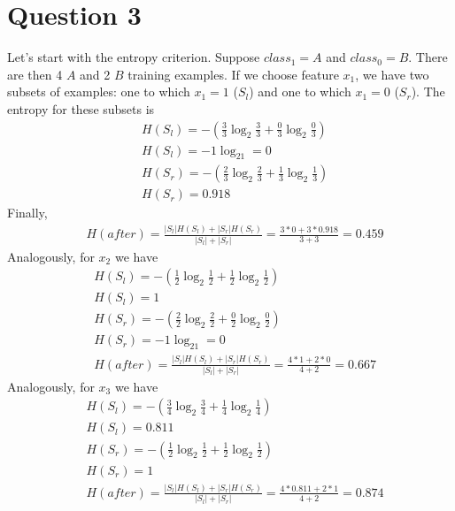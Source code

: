 \documentclass[leqno]{article}
\begin{document}
\hfill


\section*{Question 3} Let's start with the entropy criterion. Suppose $class_1 = A$ and $class_0 = B$. 
There are then 4 $A$ and 2 $B$ training examples. If we choose feature $x_1$, we have two 
subsets of examples: one to which $x_1 = 1$ ($S_l$) and one to which $x_1 = 0$ ($S_r$). The entropy for these 
subsets is 
\begin{equation*}
\begin{split}
&H(S_l) = -(\frac{3}{3}\log_2\frac{3}{3} + \frac{0}{3}\log_2\frac{0}{3}) \\
&H(S_l) = -1\log_21 = 0\\
&H(S_r) = -(\frac{2}{3}\log_2\frac{2}{3} + \frac{1}{3}\log_2\frac{1}{3}) \\
&H(S_r) = 0.918
\end{split}
\end{equation*}
Finally,
\begin{equation*}
\begin{split}
&H(after) = \frac{|S_l|H(S_l) + |S_r|H(S_r)}{|S_l| + |S_r|} = \frac{3*0 + 3*0.918}{3 + 3} = 0.459
\end{split}
\end{equation*} 
Analogously, for $x_2$ we have
\begin{equation*}
\begin{split}
&H(S_l) = -(\frac{1}{2}\log_2\frac{1}{2} + \frac{1}{2}\log_2\frac{1}{2}) \\
&H(S_l) = 1\\
&H(S_r) = -(\frac{2}{2}\log_2\frac{2}{2} + \frac{0}{2}\log_2\frac{0}{2})\\
&H(S_r) = -1\log_21 = 0\\
&H(after) = \frac{|S_l|H(S_l) + |S_r|H(S_r)}{|S_l| + |S_r|} = \frac{4*1 + 2*0}{4 + 2} = 0.667
\end{split}
\end{equation*}
Analogously, for $x_3$ we have
\begin{equation*}
\begin{split}
&H(S_l) = -(\frac{3}{4}\log_2\frac{3}{4} + \frac{1}{4}\log_2\frac{1}{4}) \\
&H(S_l) = 0.811\\
&H(S_r) = -(\frac{1}{2}\log_2\frac{1}{2} + \frac{1}{2}\log_2\frac{1}{2})\\
&H(S_r) = 1\\
&H(after) = \frac{|S_l|H(S_l) + |S_r|H(S_r)}{|S_l| + |S_r|} = \frac{4*0.811 + 2*1}{4 + 2} = 0.874
\end{split}
\end{equation*}
\end{document}
